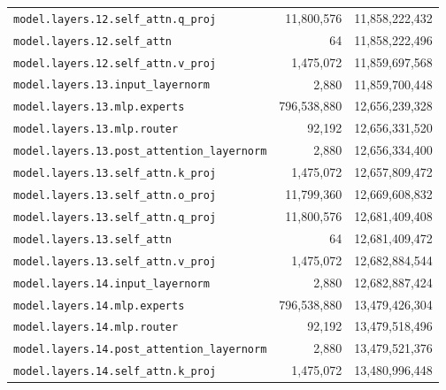 \documentclass[10pt,a4paper]{article}
\theoremstyle{definition}
\begin{document}
\begin{appendices}
\begin{longtable}{p{9.5cm}rr}
\texttt{model.\allowbreak{}layers.\allowbreak{}12.\allowbreak{}self\_attn.\allowbreak{}q\_proj} & 11,800,576 & 11,858,222,432 \\
\texttt{model.\allowbreak{}layers.\allowbreak{}12.\allowbreak{}self\_attn} & 64 & 11,858,222,496 \\
\texttt{model.\allowbreak{}layers.\allowbreak{}12.\allowbreak{}self\_attn.\allowbreak{}v\_proj} & 1,475,072 & 11,859,697,568 \\
\texttt{model.\allowbreak{}layers.\allowbreak{}13.\allowbreak{}input\_layernorm} & 2,880 & 11,859,700,448 \\
\texttt{model.\allowbreak{}layers.\allowbreak{}13.\allowbreak{}mlp.\allowbreak{}experts} & 796,538,880 & 12,656,239,328 \\
\texttt{model.\allowbreak{}layers.\allowbreak{}13.\allowbreak{}mlp.\allowbreak{}router} & 92,192 & 12,656,331,520 \\
\texttt{model.\allowbreak{}layers.\allowbreak{}13.\allowbreak{}post\_attention\_layernorm} & 2,880 & 12,656,334,400 \\
\texttt{model.\allowbreak{}layers.\allowbreak{}13.\allowbreak{}self\_attn.\allowbreak{}k\_proj} & 1,475,072 & 12,657,809,472 \\
\texttt{model.\allowbreak{}layers.\allowbreak{}13.\allowbreak{}self\_attn.\allowbreak{}o\_proj} & 11,799,360 & 12,669,608,832 \\
\texttt{model.\allowbreak{}layers.\allowbreak{}13.\allowbreak{}self\_attn.\allowbreak{}q\_proj} & 11,800,576 & 12,681,409,408 \\
\texttt{model.\allowbreak{}layers.\allowbreak{}13.\allowbreak{}self\_attn} & 64 & 12,681,409,472 \\
\texttt{model.\allowbreak{}layers.\allowbreak{}13.\allowbreak{}self\_attn.\allowbreak{}v\_proj} & 1,475,072 & 12,682,884,544 \\
\texttt{model.\allowbreak{}layers.\allowbreak{}14.\allowbreak{}input\_layernorm} & 2,880 & 12,682,887,424 \\
\texttt{model.\allowbreak{}layers.\allowbreak{}14.\allowbreak{}mlp.\allowbreak{}experts} & 796,538,880 & 13,479,426,304 \\
\texttt{model.\allowbreak{}layers.\allowbreak{}14.\allowbreak{}mlp.\allowbreak{}router} & 92,192 & 13,479,518,496 \\
\texttt{model.\allowbreak{}layers.\allowbreak{}14.\allowbreak{}post\_attention\_layernorm} & 2,880 & 13,479,521,376 \\
\texttt{model.\allowbreak{}layers.\allowbreak{}14.\allowbreak{}self\_attn.\allowbreak{}k\_proj} & 1,475,072 & 13,480,996,448 \\

\end{longtable}
\end{appendices}
\end{document}
